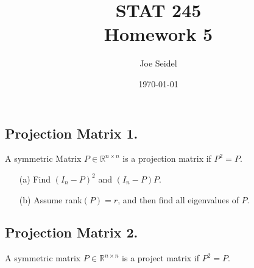 \documentclass{tufte-book}
\title{STAT  245\\Homework 5}
\author{Joe Seidel}
\date{\today}
\begin{document}
\maketitle
{}
\newpage
{}

\subsection{Projection Matrix 1.}
A symmetric Matrix $P \in \mathbb{R}^{n \times n}$ is a projection matrix if $P^2=P$.

\begin{enumerate}

\item[(a)] Find $(I_n - P)^2$ and $(I_n - P)P$.

\item[(b)] Assume rank$(P)=r$, and then find all eigenvalues of $P$.

\end{enumerate}

\subsection{Projection Matrix 2.} A symmetric matrix $P\in \mathbb{R}^{n \times n}$ is a project matrix if $P^2=P$.
\end{document}
